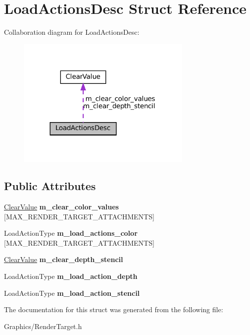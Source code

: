 \hypertarget{structLoadActionsDesc}{}\section{Load\+Actions\+Desc Struct Reference}
\label{structLoadActionsDesc}


Collaboration diagram for Load\+Actions\+Desc\+:\nopagebreak
\begin{figure}[H]
\begin{center}
\leavevmode
\includegraphics[width=240pt]{structLoadActionsDesc__coll__graph}
\end{center}
\end{figure}
\subsection*{Public Attributes}
\begin{DoxyCompactItemize}
\item 
\mbox{\label{structLoadActionsDesc_ae680a023438374892f4841fee504018b}} 
\hyperlink{structClearValue}{Clear\+Value} {\bfseries m\+\_\+clear\+\_\+color\+\_\+values} \mbox{[}M\+A\+X\+\_\+\+R\+E\+N\+D\+E\+R\+\_\+\+T\+A\+R\+G\+E\+T\+\_\+\+A\+T\+T\+A\+C\+H\+M\+E\+N\+TS\mbox{]}
\item 
\mbox{\label{structLoadActionsDesc_a02142788dde339d932f85784a08a95fa}} 
Load\+Action\+Type {\bfseries m\+\_\+load\+\_\+actions\+\_\+color} \mbox{[}M\+A\+X\+\_\+\+R\+E\+N\+D\+E\+R\+\_\+\+T\+A\+R\+G\+E\+T\+\_\+\+A\+T\+T\+A\+C\+H\+M\+E\+N\+TS\mbox{]}
\item 
\mbox{\label{structLoadActionsDesc_a5d76135f4e3ce90d27c0d6b55cceea22}} 
\hyperlink{structClearValue}{Clear\+Value} {\bfseries m\+\_\+clear\+\_\+depth\+\_\+stencil}
\item 
\mbox{\label{structLoadActionsDesc_a034dd585a633b402cfbdbbf971285bb0}} 
Load\+Action\+Type {\bfseries m\+\_\+load\+\_\+action\+\_\+depth}
\item 
\mbox{\label{structLoadActionsDesc_a829e0735a33d6204640b2df537b3c755}} 
Load\+Action\+Type {\bfseries m\+\_\+load\+\_\+action\+\_\+stencil}
\end{DoxyCompactItemize}


The documentation for this struct was generated from the following file\+:\begin{DoxyCompactItemize}
\item 
Graphics/Render\+Target.\+h\end{DoxyCompactItemize}
